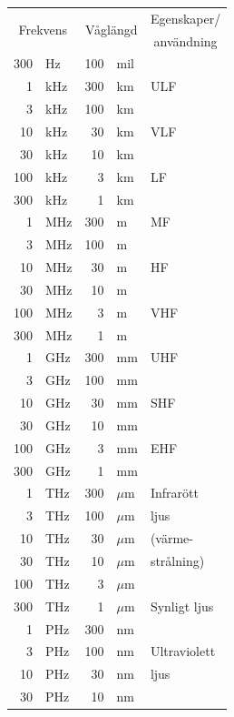 \begin{margintable}
\begin{center}
\begin{tabular}{|rl|rl|l|}
\hline
\multicolumn{2}{|c|}{\multirow{2}{*}{Frekvens}} & \multicolumn{2}{|c|}{\multirow{2}{*}{Våglängd}} & \multicolumn{1}{|c|}{Egenskaper/} \\
 & & & & \multicolumn{1}{|c|}{användning} \\ \hline
300 & Hz  & 100 & mil & \\
  1 & kHz & 300 & km & ULF \\ \cline{5-5}
  3 & kHz & 100 & km & \\
 10 & kHz &  30 & km & VLF \\ \cline{5-5}
 30 & kHz &  10 & km & \\
100 & kHz &   3 & km & LF \\ \cline{5-5}
300 & kHz &   1 & km & \\
  1 & MHz & 300 & m & MF \\ \cline{5-5}
  3 & MHz & 100 & m & \\
 10 & MHz &  30 & m & HF \\ \cline{5-5}
 30 & MHz &  10 & m & \\
100 & MHz &   3 & m & VHF \\ \cline{5-5}
300 & MHz &   1 & m & \\
  1 & GHz & 300 & mm & UHF \\ \cline{5-5}
  3 & GHz & 100 & mm & \\
 10 & GHz &  30 & mm & SHF \\ \cline{5-5}
 30 & GHz &  10 & mm & \\
100 & GHz &   3 & mm & EHF\\ \cline{5-5}
300 & GHz &   1 & mm & \\\
  1 & THz & 300 & \(\mu\)m & Infrarött \\
  3 & THz & 100 & \(\mu\)m & ljus \\
 10 & THz &  30 & \(\mu\)m & (värme- \\
 30 & THz &  10 & \(\mu\)m & strålning) \\
100 & THz &   3 & \(\mu\)m & \\ \cline{5-5}
300 & THz &   1 & \(\mu\)m & Synligt ljus \\ \cline{5-5}
  1 & PHz & 300 & nm & \\
  3 & PHz & 100 & nm & Ultraviolett \\
 10 & PHz &  30 & nm & ljus \\ \cline{5-5}
 30 & PHz &  10 & nm & \\

\end{tabular}
\end{center}
\end{margintable}
